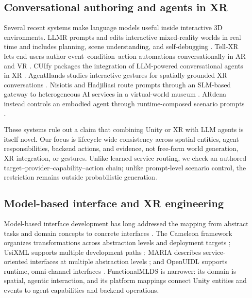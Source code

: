 \subsection{Conversational authoring and agents in XR}

Several recent systems make language models useful inside interactive 3D
environments. LLMR prompts and edits interactive mixed-reality worlds in real
time and includes planning, scene understanding, and self-debugging
\cite{delatorre2024llmr}. Tell-XR lets end users author event--condition--action
automations conversationally in AR and VR
\cite{carcangiu2025tellxr}. CUIfy packages the integration of LLM-powered
conversational agents in XR \cite{buldu2025cuify}. AgentHands studies
interactive gestures for spatially grounded XR conversations
\cite{liu2026agenthands}. Nisiotis and Hadjiliasi route prompts through an
SLM-based gateway to heterogeneous AI services in a virtual-world museum
\cite{nisiotis2026prompt}. ARdena instead controls an embodied agent through
runtime-composed scenario prompts \cite{borozan2026ardena}.

These systems rule out a claim that combining Unity or XR with LLM agents is
itself novel. Our focus is lifecycle-wide consistency across spatial entities,
agent responsibilities, backend actions, and evidence, not free-form world
generation, XR integration, or gestures. Unlike learned service routing, we
check an authored target--provider--capability--action chain; unlike prompt-level
scenario control, the restriction remains outside probabilistic generation.

\subsection{Model-based interface and XR engineering}

Model-based interface development has long addressed the mapping from abstract
tasks and domain concepts to concrete interfaces
\cite{puerta1999framework}. The Cameleon framework organizes transformations
across abstraction levels and deployment targets
\cite{calvary2003cameleon}; UsiXML supports multiple development paths
\cite{limbourg2005usixml}; MARIA describes service-oriented interfaces at
multiple abstraction levels \cite{paterno2009maria}; and OpenUIDL supports
runtime, omni-channel interfaces \cite{moldovan2020openuidl}. FunctionalMLDS is
narrower: its domain is spatial, agentic interaction, and its platform mappings
connect Unity entities and events to agent capabilities and backend operations.

